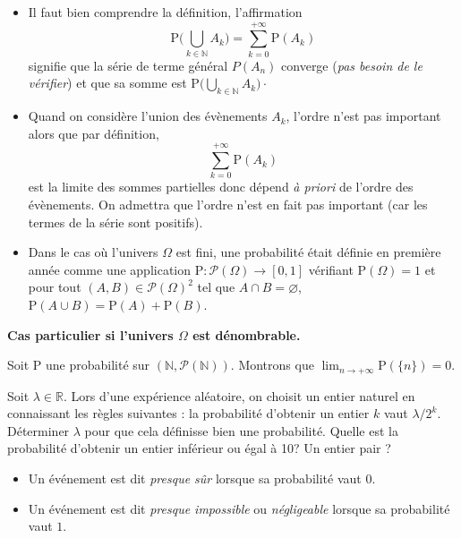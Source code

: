 \documentclass[french,11pt,twoside]{VcCours}
\renewcommand{\P}{\text{P}}
\begin{document}
\begin{Remarques}{}
\begin{itemize} 
\item Il faut bien comprendre  la définition, l'affirmation 
\[  \P\Big(\bigcup\limits_{k\in \mathbb N} A_k\Big) = \sum\limits_{k=0}^{+\infty } \P(A_k) \]
signifie que la série de terme général $P(A_n)$ converge (\emph{pas besoin de le vérifier}) et que sa somme est $\P\Big(\bigcup\limits_{k\in \mathbb N} A_k\Big) \cdot$
\item Quand on considère l'union des évènements $A_k$, l'ordre n'est pas important alors que par définition,
$$ \sum\limits_{k=0}^{+\infty } \P(A_k)$$
est la limite des sommes partielles donc dépend \emph{à priori} de l'ordre des évènements. On admettra que l'ordre n'est en fait pas important (car les termes de la série sont positifs).
\item Dans le cas où l'univers $\Omega$ est fini, une probabilité était définie en première année comme une application $\P : \mathcal{P}(\Omega) \rightarrow [0,1]$ vérifiant $\P(\Omega)=1$ et pour tout $(A,B) \in \mathcal{P}(\Omega)^2$ tel que $A \cap B=\varnothing$, $\P(A \cup B)=\P(A)+\P(B)$.
\end{itemize}
\end{Remarques}{}


\newpage
\textbf{Cas particulier si l'univers $\Omega$ est dénombrable.}


\vspace*{9cm}

\begin{Exemple} Soit $\P$ une probabilité sur $(\mathbb{N}, \mathcal{P}(\mathbb{N}))$. Montrons que $\lim_{n \rightarrow + \infty} \P( \lbrace n \rbrace )= 0$.
  \vspace*{2cm}
\end{Exemple}
\begin{ApplicationDirecte}{}
Soit $\lambda \in \mathbb{R}$. Lors d'une expérience aléatoire, on choisit un entier naturel en connaissant les règles suivantes : la probabilité d'obtenir un entier $k$ vaut $ \lambda/2^k$. Déterminer $\lambda$ pour que cela définisse bien une probabilité. Quelle est la probabilité d'obtenir un entier inférieur ou égal à 10? Un entier pair ?
\end{ApplicationDirecte}

\begin{Definition}{}
\begin{itemize}
\item Un événement est dit \emph{presque sûr} lorsque sa probabilité vaut $0$.
\item Un événement est dit \emph{presque impossible} ou \emph{négligeable} lorsque sa probabilité vaut $1$.
\end{itemize}
\end{Definition}
\end{document}
